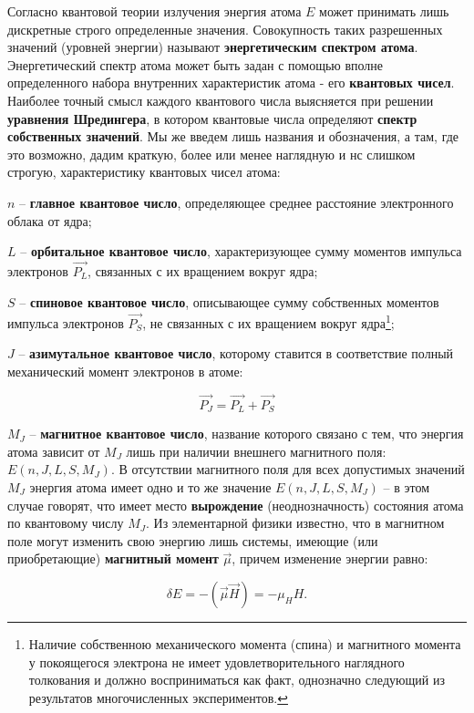 Согласно квантовой теории излучения энергия атома $E$ может принимать лишь дискретные строго определенные значения. Совокупность таких разрешенных значений (уровней энергии) называют \textbf{энергетическим спектром атома}. Энергетический спектр атома может быть задан с помощью вполне определенного набора внутренних характеристик атома - его \textbf{квантовых чисел}. Наиболее точный смысл каждого квантового числа выясняется при решении \textbf{уравнения Шредингера}, в котором квантовые числа определяют \textbf{спектр собственных значений}. Мы же введем лишь названия и обозначения, а там, где это возможно, дадим краткую, более или менее наглядную и нс слишком строгую, характеристику квантовых чисел атома:

$n$ -- \textbf{главное квантовое число}, определяющее среднее расстояние электронного облака от ядра;

$L$ -- \textbf{орбитальное квантовое число}, характеризующее сумму моментов импульса электронов $\vec{P_L}$, связанных с их вращением вокруг ядра;

$S$ -- \textbf{спиновое квантовое число}, описывающее сумму собственных моментов импульса электронов $\vec{P_S}$, не связанных с их вращением вокруг ядра\footnote{Наличие собственною механического момента (спина) и магнитного момента у покоящегося электрона не имеет удовлетворительного наглядного толкования и должно восприниматься как факт, однозначно следующий из результатов многочисленных экспериментов.};

$J$ -- \textbf{азимутальное квантовое число}, которому ставится в соответствие полный механический момент электронов в атоме:

\begin{equation}
	\vec{P_J}=\vec{P_L}+\vec{P_S}
	\label{eq:1}
\end{equation}

$M_J$ -- \textbf{магнитное квантовое число}, название которого связано с тем, что энергия атома зависит от $M_J$ лишь при наличии внешнего магнитного поля: $E(n,J,L,S,M_J)$. В отсутствии магнитного поля для всех допустимых значений $M_J$ энергия атома имеет одно и то же значение $E(n,J,L,S,M_J)$ -- в этом случае говорят, что имеет место \textbf{вырождение} (неоднозначность) состояния атома по квантовому числу $M_J$. Из элементарной физики известно, что в магнитном поле могут изменить свою энергию лишь системы, имеющие (или приобретающие) \textbf{магнитный момент} $\vec{\mu}$, причем изменение энергии равно:

\begin{equation}
	\delta E=-(\vec{\mu}\vec{H})=-\mu_HH.
	\label{eq:2}
\end{equation}

